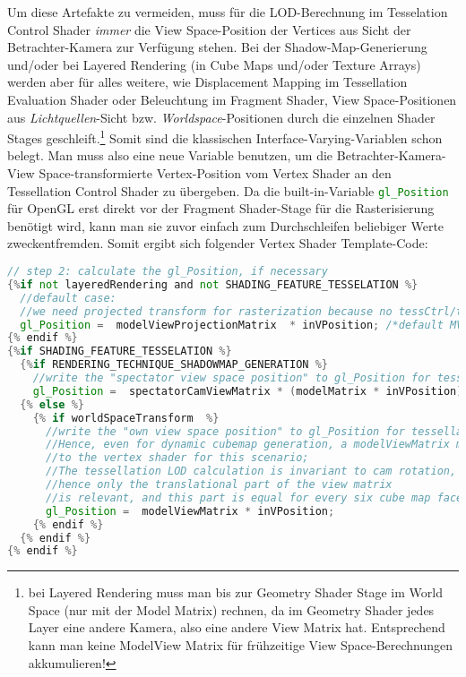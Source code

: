 	Um diese Artefakte zu vermeiden, muss für die LOD-Berechnung im Tesselation Control Shader
	\emph{immer} die View Space-Position der Vertices aus Sicht der Betrachter-Kamera zur Verfügung stehen.
	Bei der Shadow-Map-Generierung und/oder bei Layered Rendering (in Cube Maps und/oder Texture Arrays)
	werden aber für alles weitere, wie Displacement Mapping im Tessellation Evaluation Shader oder Beleuchtung
	im Fragment Shader, View Space-Positionen aus \emph{Lichtquellen}-Sicht bzw. \emph{Worldspace}-Positionen durch die
	einzelnen Shader Stages geschleift.\footnote{bei Layered Rendering muss man bis zur Geometry Shader Stage im 
	World Space (nur mit der Model Matrix) rechnen, da im Geometry Shader jedes Layer eine andere Kamera, also eine andere 
	View Matrix hat. Entsprechend kann  man keine ModelView Matrix für frühzeitige View Space-Berechnungen akkumulieren!}
	Somit sind die klassischen Interface-Varying-Variablen schon belegt.
	Man muss also eine neue Variable benutzen, um die Betrachter-Kamera- View Space-transformierte Vertex-Position
	vom Vertex Shader an den Tessellation Control Shader zu übergeben. Da die built-in-Variable
	\lstinline[language=GLSL]|gl_Position| für OpenGL erst direkt vor der Fragment Shader-Stage für die Rasterisierung
	benötigt wird, kann man sie zuvor einfach zum Durchschleifen beliebiger Werte zweckentfremden. Somit ergibt sich
	folgender Vertex Shader Template-Code:
	\begin{lstlisting}[language=GLSL]
// step 2: calculate the gl_Position, if necessary 
{%if not layeredRendering and not SHADING_FEATURE_TESSELATION %} 
  //default case:
  //we need projected transform for rasterization because no tessCtrl/tessEval/geom shader follows the vertex shader;
  gl_Position =  modelViewProjectionMatrix  * inVPosition; /*default MVP transform*/   
{% endif %} 
{%if SHADING_FEATURE_TESSELATION %} 
  {%if RENDERING_TECHNIQUE_SHADOWMAP_GENERATION %}
    //write the "spectator view space position" to gl_Position for tessellation LOD calculations 
    gl_Position =  spectatorCamViewMatrix * (modelMatrix * inVPosition);
  {% else %}
    {% if worldSpaceTransform  %}
      //write the "own view space position" to gl_Position for tessellation LOD calculations; 
      //Hence, even for dynamic cubemap generation, a modelViewMatrix must be passed 
      //to the vertex shader for this scenario;
      //The tessellation LOD calculation is invariant to cam rotation, 
      //hence only the translational part of the view matrix
      //is relevant, and this part is equal for every six cube map faces;
      gl_Position =  modelViewMatrix * inVPosition;
    {% endif %}
  {% endif %}
{% endif %}
	\end{lstlisting}
	
